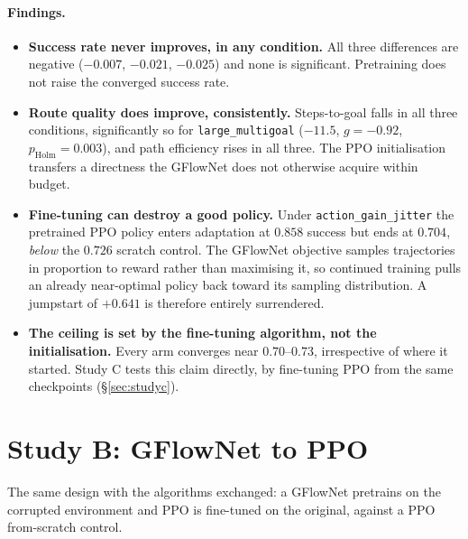 \paragraph{Findings.}
\begin{itemize}
  \item \textbf{Success rate never improves, in any condition.} All three differences are negative ($-0.007$, $-0.021$, $-0.025$) and none is significant. Pretraining does not raise the converged success rate.
  \item \textbf{Route quality does improve, consistently.} Steps-to-goal falls in all three conditions, significantly so for \texttt{large\_multigoal} ($-11.5$, $g=-0.92$, $p_{\mathrm{Holm}}=0.003$), and path efficiency rises in all three. The PPO initialisation transfers a directness the GFlowNet does not otherwise acquire within budget.
  \item \textbf{Fine-tuning can destroy a good policy.} Under \texttt{action\_gain\_jitter} the pretrained PPO policy enters adaptation at $0.858$ success but ends at $0.704$, \emph{below} the $0.726$ scratch control. The GFlowNet objective samples trajectories in proportion to reward rather than maximising it, so continued training pulls an already near-optimal policy back toward its sampling distribution. A jumpstart of $+0.641$ is therefore entirely surrendered.
  \item \textbf{The ceiling is set by the fine-tuning algorithm, not the initialisation.} Every arm converges near $0.70$--$0.73$, irrespective of where it started. Study C tests this claim directly, by fine-tuning PPO from the same checkpoints (\S\ref{sec:studyc}).
\end{itemize}

\clearpage
\section{Study B: GFlowNet to PPO}

The same design with the algorithms exchanged: a GFlowNet pretrains on the
corrupted environment and PPO is fine-tuned on the original, against a PPO
from-scratch control.

